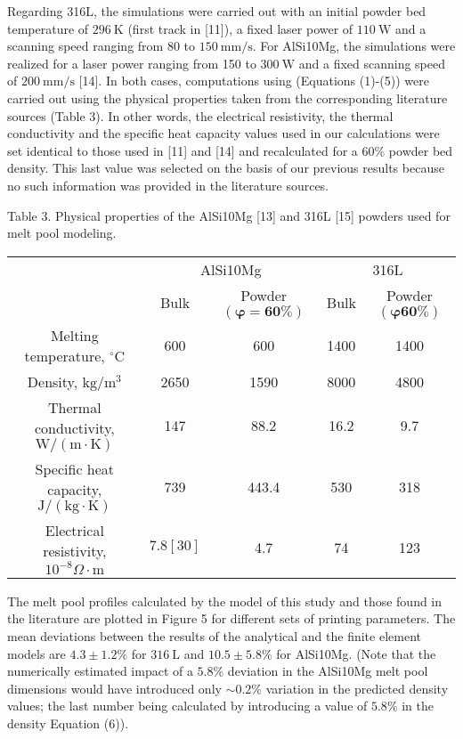 \documentclass[10pt]{article}
\begin{document}
Regarding 316L, the simulations were carried out with an initial powder bed temperature of $296 \mathrm{~K}$ (first track in [11]), a fixed laser power of $110 \mathrm{~W}$ and a scanning speed ranging from 80 to $150 \mathrm{~mm} / \mathrm{s}$. For AlSi10Mg, the simulations were realized for a laser power ranging from 150 to $300 \mathrm{~W}$ and a fixed scanning speed of $200 \mathrm{~mm} / \mathrm{s}$ [14]. In both cases, computations using (Equations (1)-(5)) were carried out using the physical properties taken from the corresponding literature sources (Table 3). In other words, the electrical resistivity, the thermal conductivity and the specific heat capacity values used in our calculations were set identical to those used in [11] and [14] and recalculated for a $60 \%$ powder bed density. This last value was selected on the basis of our previous results because no such information was provided in the literature sources.

Table 3. Physical properties of the AlSi10Mg [13] and 316L [15] powders used for melt pool modeling.

\begin{center}
\begin{tabular}{ccccc}
\hline
 & \multicolumn{2}{c}{AlSi10Mg} & \multicolumn{2}{c}{316L} \\
\cline { 2 - 5 }
 & Bulk & Powder $(\boldsymbol{\varphi = 6 0 \%})$ & Bulk & Powder $(\boldsymbol{\varphi} \mathbf{6 0 \%})$ \\
\hline
Melting temperature, ${ }^{\circ} \mathrm{C}$ & 600 & 600 & 1400 & 1400 \\
Density, $\mathrm{kg} / \mathrm{m}^{3}$ & 2650 & 1590 & 8000 & 4800 \\
Thermal conductivity, $\mathrm{W} /(\mathrm{m} \cdot \mathrm{K})$ & 147 & 88.2 & 16.2 & 9.7 \\
Specific heat capacity, $\mathrm{J} /(\mathrm{kg} \cdot \mathrm{K})$ & 739 & 443.4 & 530 & 318 \\
Electrical resistivity, $10^{-8} \Omega \cdot \mathrm{m}$ & $7.8[30]$ & 4.7 & 74 & 123 \\
\hline
\end{tabular}
\end{center}

The melt pool profiles calculated by the model of this study and those found in the literature are plotted in Figure 5 for different sets of printing parameters. The mean deviations between the results of the analytical and the finite element models are $4.3 \pm 1.2 \%$ for $316 \mathrm{~L}$ and $10.5 \pm 5.8 \%$ for AlSi10Mg. (Note that the numerically estimated impact of a $5.8 \%$ deviation in the AlSi10Mg melt pool dimensions would have introduced only $\sim 0.2 \%$ variation in the predicted density values; the last number being calculated by introducing a value of $5.8 \%$ in the density Equation (6)).
\end{document}
